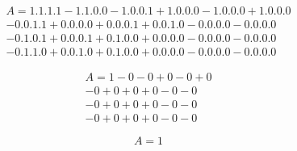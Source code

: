 \documentclass{article}
\begin{document}
\begin{equation*}
    \begin{split}   
    A = 1.1.1.1 - 1.1.0.0 - 1.0.0.1 + 1.0.0.0 - 1.0.0.0 + 1.0.0.0\\
    - 0.0.1.1 + 0.0.0.0 + 0.0.0.1 + 0.0.1.0 - 0.0.0.0  - 0.0.0.0\\
    - 0.1.0.1 + 0.0.0.1 + 0.1.0.0 + 0.0.0.0 - 0.0.0.0 - 0.0.0.0\\
    - 0.1.1.0 + 0.0.1.0 + 0.1.0.0 + 0.0.0.0 - 0.0.0.0 -0.0.0.0
\end{split}
\end{equation*}

\begin{equation*}
    \begin{split} 
    A =  1 - 0 - 0 + 0 - 0 + 0\\ 
    - 0 + 0 + 0 + 0 - 0 - 0\\
    - 0 + 0 + 0 + 0 - 0 - 0\\
    - 0 + 0 + 0 + 0 - 0 - 0 
\end{split}
\end{equation*}

\[
A = 1  
\]
\end{document}
